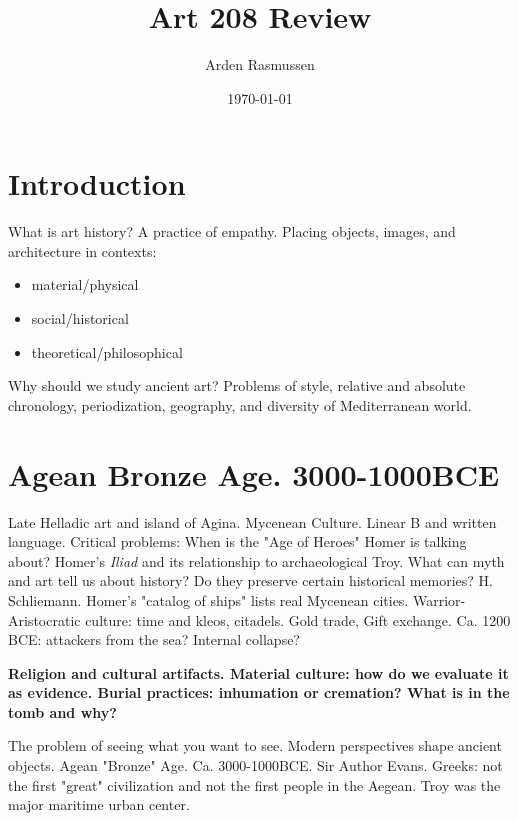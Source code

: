 \documentclass[10pt]{armath}
\title{Art 208 Review}
\author{Arden Rasmussen}
\date{\today}
\begin{document}
\maketitle

\begin{multicols}{2}
  \section{Introduction}%
  \label{sec:introduction}

  What is art history? A practice of empathy. Placing objects, images, and
  architecture in contexts:

  \begin{itemize}
    \item material/physical
    \item social/historical
    \item theoretical/philosophical
  \end{itemize}

  Why should we study ancient art? Problems of style, relative and absolute
  chronology, periodization, geography, and diversity of Mediterranean world.

  \section{Agean Bronze Age. 3000-1000BCE}%
  \label{sec:agean_bronze_age_3000_1000bce}
  
  Late Helladic art and island of Agina. Mycenean Culture. Linear B and written
  language. Critical problems: When is the "Age of Heroes" Homer is talking
  about? Homer's \textit{Iliad} and its relationship to archaeological Troy.
  What can myth and art tell us about history? Do they preserve certain
  historical memories? H. Schliemann. Homer's "catalog of ships" lists real
  Mycenean cities. Warrior-Aristocratic culture: time and kleos, citadels. Gold
  trade, Gift exchange. Ca. 1200 BCE: attackers from the sea? Internal
  collapse?

  \textbf{
  Religion and cultural artifacts. Material culture: how do we evaluate it as
  evidence. Burial practices: inhumation or cremation? What is in the tomb and
  why?
  } 

  The problem of seeing what you want to see. Modern perspectives shape ancient
  objects. Agean "Bronze" Age. Ca. 3000-1000BCE. Sir Author Evans. Greeks: not
  the first "great" civilization and not the first people in the Aegean. Troy
  was the major maritime urban center.


\end{multicols}
\end{document}

